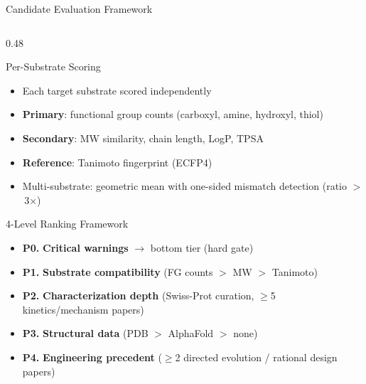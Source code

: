 \documentclass[aspectratio=169, 11pt]{beamer}
\begin{document}
\begin{frame}{Candidate Evaluation Framework}
\begin{columns}[T]
\begin{column}{0.48\textwidth}
\begin{exampleblock}{\small Per-Substrate Scoring}
\vspace{-2pt}
\begin{itemize}\scriptsize
\setlength\itemsep{1pt}
\item Each target substrate scored independently
\item \textbf{Primary}: functional group counts (carboxyl, amine, hydroxyl, thiol)
\item \textbf{Secondary}: MW similarity, chain length, LogP, TPSA
\item \textbf{Reference}: Tanimoto fingerprint (ECFP4)
\item Multi-substrate: geometric mean with one-sided mismatch detection (ratio $>$\,3$\times$)
\end{itemize}
\end{exampleblock}

\vspace{2pt}
\begin{block}{\small 4-Level Ranking Framework}
\vspace{-2pt}
\begin{itemize}\scriptsize
\setlength\itemsep{0pt}
\item \textbf{P0.} {\color{accentred}\textbf{Critical warnings}} $\rightarrow$ bottom tier (hard gate)
\item \textbf{P1.} \textbf{Substrate compatibility} (FG counts $>$ MW $>$ Tanimoto)
\item \textbf{P2.} \textbf{Characterization depth} (Swiss-Prot curation, $\geq$5 kinetics/mechanism papers)
\item \textbf{P3.} \textbf{Structural data} (PDB $>$ AlphaFold $>$ none)
\item \textbf{P4.} \textbf{Engineering precedent} ($\geq$2 directed evolution / rational design papers)
\end{itemize}
\end{block}

\end{column}
\end{columns}
\end{frame}
\end{document}
